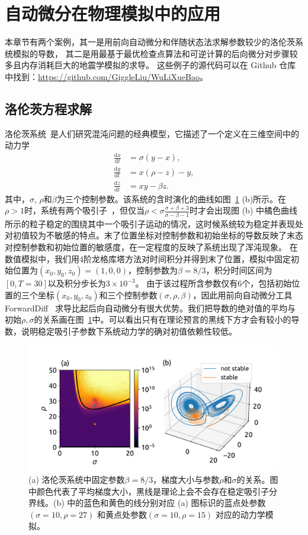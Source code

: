 \documentclass[A4,twoside,UTF8]{ctexart}
\def\D{\mathrm{d}}
\begin{document}
\section{自动微分在物理模拟中的应用}\label{sec:applications}
本章节有两个案例，其一是用前向自动微分和伴随状态法求解参数较少的洛伦茨系统模拟的导数，
其二是用最基于最优检查点算法和可逆计算的后向微分对步骤较多且内存消耗巨大的地震学模拟的求导。
这些例子的源代码可以在 Github 仓库中找到：\href{https://github.com/GiggleLiu/WuLiXueBao}{https://github.com/GiggleLiu/WuLiXueBao}。

\subsection{洛伦茨方程求解}
洛伦茨系统~\cite{Lorenz1963}是人们研究混沌问题的经典模型，它描述了一个定义在三维空间中的动力学
\begin{align*}
    \frac{\D x}{\D t} &= \sigma(y - x),\\
    \frac{\D y}{\D t} &= x(\rho -z) - y,\\
    \frac{\D z}{\D t} &= xy-\beta z.
\end{align*}
其中，$\sigma$, $\rho$和$\beta$为三个控制参数。该系统的含时演化的曲线如图~\ref{fig:chaos} (b)所示。在$\rho>1$时，系统有两个吸引子~\cite{Hirsch2012}，但仅当$\rho < \sigma \frac{\sigma + \beta + 3}{\sigma - \beta - 1}$时才会出现图 (b) 中橘色曲线所示的粒子稳定的围绕其中一个吸引子运动的情况，这时候系统较为稳定并表现处对初值较为不敏感的特点。末了位置坐标对控制参数和初始坐标的导数反映了末态对控制参数和初始位置的敏感度，在一定程度的反映了系统出现了浑沌现象。
在数值模拟中，我们用4阶龙格库塔方法对时间积分并得到末了位置，模拟中固定初始位置为$(x_0,y_0,z_0) = (1, 0, 0)$，控制参数为$\beta=8/3$，积分时间区间为$[0,T=30]$以及积分步长为$3\times 10^{-3}$。
由于该过程所含参数仅有6个，包括初始位置的三个坐标$(x_0, y_0, z_0)$和三个控制参数$(\sigma, \rho,\beta)$，因此用前向自动微分工具 ForwardDiff~\cite{Revels2016} 求导比起后向自动微分有很大优势。我们把导数的绝对值的平均与初始$\rho,\sigma$的关系画在图~\ref{fig:chaos}中。可以看出只有在理论预言的黑线下方才会有较小的导数，说明稳定吸引子参数下系统动力学的确对初值依赖性较低。
\begin{figure}[t]
\centering
\includegraphics[width=0.8\columnwidth]{./fig4.pdf}
    \caption{(a) 洛伦茨系统中固定参数$\beta=8/3$，梯度大小与参数$\rho$和$\sigma$的关系。图中颜色代表了平均梯度大小，黑线是理论上会不会存在稳定吸引子分界线。(b) 中的蓝色和黄色的线分别对应 (a) 图标识的蓝点处参数 $(\sigma=10, \rho=27)$ 和黄点处参数$(\sigma=10, \rho=15)$ 对应的动力学模拟。\label{fig:chaos}}
\end{figure}
\end{document}
